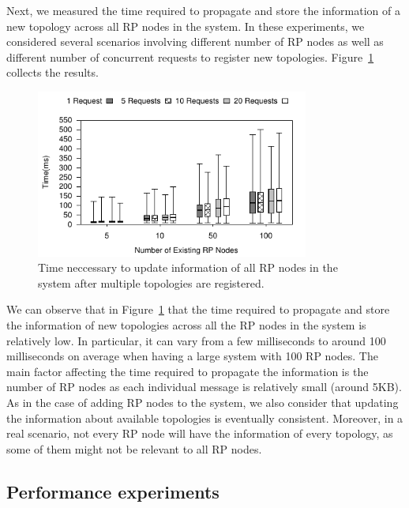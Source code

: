 Next, we measured the time required to propagate and store the information of a new topology across all RP nodes in the system. In these experiments, we considered several scenarios involving different number of RP nodes as well as different number of concurrent requests to register new topologies. Figure~\ref{fig:topology} collects the results. 

\begin{figure}[htb!]
  \centering
    \includegraphics[width=0.8\textwidth]{Figures/topologyBox.pdf}
  \caption{Time neccessary to update information of all RP nodes in the system after multiple topologies are registered.} \label{fig:topology}
    \vspace{-2ex}
\end{figure}

We can observe that in Figure~\ref{fig:topology} that the time required to propagate and store the information of new topologies across all the RP nodes in the system is relatively low. In particular, it can vary from a few milliseconds to around 100 milliseconds on average when having a large system with 100 RP nodes. The main factor affecting the time required to propagate the information is the number of RP nodes as each individual message is relatively small (around 5KB). As in the case of adding RP nodes to the system, we also consider that updating the information about available topologies is eventually consistent. Moreover, in a real scenario, not every RP node will have the information of every topology, as some of them might not be relevant to all RP nodes.

\subsection{Performance experiments}

